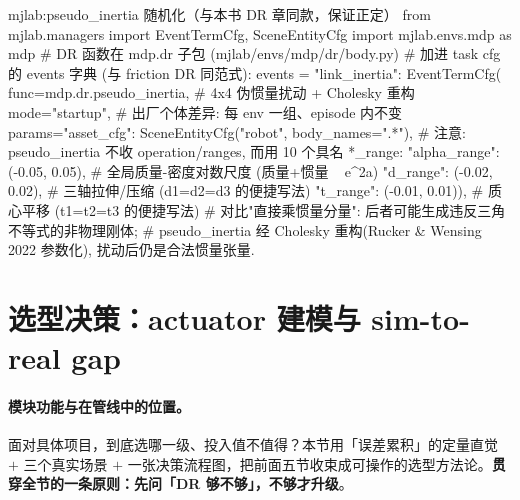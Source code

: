 \begin{codebox}[Python]{mjlab:pseudo\_inertia 随机化（与本书 DR 章同款，保证正定）}
from mjlab.managers import EventTermCfg, SceneEntityCfg
import mjlab.envs.mdp as mdp        # DR 函数在 mdp.dr 子包 (mjlab/envs/mdp/dr/body.py)
# 加进 task cfg 的 events 字典 (与 friction DR 同范式):
events = {
    "link_inertia": EventTermCfg(
        func=mdp.dr.pseudo_inertia,            # 4x4 伪惯量扰动 + Cholesky 重构
        mode="startup",                        # 出厂个体差异: 每 env 一组、episode 内不变
        params={"asset_cfg": SceneEntityCfg("robot", body_names=".*"),
                # 注意: pseudo_inertia 不收 operation/ranges, 而用 10 个具名 *_range:
                "alpha_range": (-0.05, 0.05),  # 全局质量-密度对数尺度 (质量+惯量 ~ e^{2a})
                "d_range": (-0.02, 0.02),      # 三轴拉伸/压缩 (d1=d2=d3 的便捷写法)
                "t_range": (-0.01, 0.01)}),    # 质心平移 (t1=t2=t3 的便捷写法)
}
# 对比"直接乘惯量分量": 后者可能生成违反三角不等式的非物理刚体;
# pseudo_inertia 经 Cholesky 重构(Rucker & Wensing 2022 参数化), 扰动后仍是合法惯量张量.
\end{codebox}

\begin{practice}[本节练习]
\end{practice}

\section{选型决策：actuator 建模与 sim-to-real gap}
\label{sec:rlmc-act-decision}

\paragraph{模块功能与在管线中的位置。}面对具体项目，到底选哪一级、投入值不值得？本节用「误差累积」的定量直觉 $+$ 三个真实场景 $+$ 一张决策流程图，把前面五节收束成可操作的选型方法论。\textbf{贯穿全节的一条原则：先问「DR 够不够」，不够才升级}。


